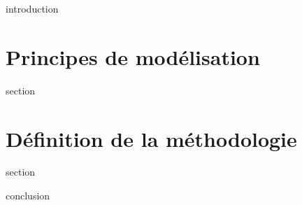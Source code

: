 \chaptertoc{}

\label{sec:4-int}
{introduction}

\section{Principes de modélisation}
\label{sec:4-1}
{section}

\section{Définition de la méthodologie}
\label{sec:4-2}
{section}

\label{sec:4-cnc}
{conclusion}


